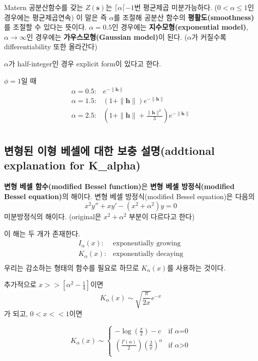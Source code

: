 \documentclass[b5paper,]{scrbook}
\theoremstyle{plain}
\theoremstyle{definition}
\numberwithin{equation}{section}
\begin{document}
Matern 공분산함수를 갖는 \(Z(\mathbf{s})\)는
\(\lceil \alpha \lceil -1\)번 평균제곱 미분가능하다.
(\(0<\alpha \leq 1\)인 경우에는 평균제곱연속) 이 말은 즉 \(\alpha\)를
조절해 공분산 함수의 \textbf{평활도(smoothness)}를 조절할 수 있다는
뜻이다. \(\alpha=0.5\)인 경우에는 \textbf{지수모형(exponential model)},
\(\alpha \rightarrow \infty\)인 경우에는 \textbf{가우스모형(Gaussian
model)}이 된다. (\(\alpha\)가 커질수록 differentiability 또한 올라간다)

\(\alpha\)가 half-integer인 경우 explicit form이 있다고 한다.

\(\phi=1\)일 때 \[
\begin{array}{ll}
\alpha=0.5: & e^{-\|\mathbf{h}\|}\\
\alpha=1.5: & (1+\|\mathbf{h}\|)e^{-\|\mathbf{h}\|}\\
\alpha=2.5: & (1+\|\mathbf{h}\| + \frac{\|\mathbf{h}\|^{2}}{3})e^{-\|\mathbf{h}\|}\\
\end{array}
\]

\subsection{변형된 이형 베셀에 대한 보충 설명(addtional explanation for
K\_alpha)}\label{-----addtional-explanation-for-k_alpha}

\textbf{변형 베셀 함수(modified Bessel function)}은 \textbf{변형 베셀
방정식(modified Bessel equation)}의 해이다. 변형 베셀 방정식(modified
Bessel equation)은 다음의 \[x^{2}y''+xy'-(x^{2}+\alpha^{2})y=0\]
미분방정식의 해이다. (original은 \(x^{2}+\alpha^{2}\) 부분이 다르다고
한다)

이 해는 두 개가 존재한다. \[
\begin{array}{ll}
I_{\alpha}(x): & \text{exponentially growing}\\
K_{\alpha}(x): & \text{exponentially decaying}\\
\end{array}
\] 우리는 감소하는 형태의 함수를 필요로 하므로 \(K_{\alpha}(x)\)를
사용하는 것이다.

추가적으로 \(x >> [\alpha^{2}-\frac{1}{4}]\)이면
\[K_{\alpha}(x) \sim \sqrt{\frac{\pi}{2x}}e^{-x}\] 가 되고,
\(0<x<<1\)이면

\[
K_{\alpha}(x) \sim \left\{ \begin{array}{ll}
-\log (\frac{x}{2}) - c & \textrm{if $\alpha$=0}\\
(\frac{\Gamma(\alpha)}{2})(\frac{2}{x})^{\alpha} & \textrm{if $\alpha$>0}\\
\end{array} \right.
\]
\end{document}
